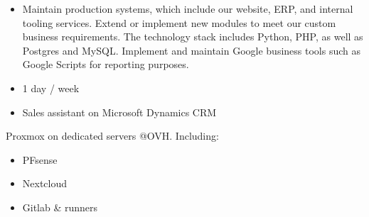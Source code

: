 \documentclass[10pt,a4paper]{altacv}
\begin{document}

\begin{fullwidth}
\makecvheader
\end{fullwidth}


\begin{itemize}
\item Maintain production systems, which include our website, ERP, and internal tooling
services. Extend or implement new modules to meet our custom business
requirements. The technology stack includes Python, PHP, as well as Postgres and
MySQL. Implement and maintain Google business tools such as Google Scripts for
reporting purposes.
\end{itemize}

\divider

\begin{itemize}
\item 1 day / week
\item Sales assistant on Microsoft Dynamics CRM
\end{itemize}

Proxmox on dedicated servers @OVH. Including:
\smallskip
\begin{itemize}
\item PFsense
\item Nextcloud
\item Gitlab \& runners
\end{itemize}
\end{document}
